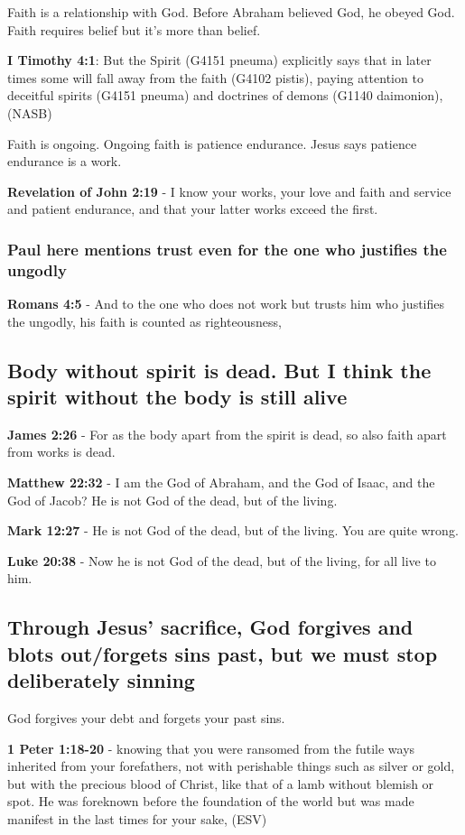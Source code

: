 \documentclass[11pt]{article}
\begin{document}
Faith is a relationship with God.
Before Abraham believed God, he obeyed God.
Faith requires belief but it's more than belief.

\textbf{I Timothy 4:1}: But the Spirit (G4151 pneuma) explicitly says that in later times some will fall away from the faith (G4102 pistis), paying attention to deceitful spirits (G4151 pneuma) and doctrines of demons (G1140 daimonion), (NASB)

Faith is ongoing. Ongoing faith is patience endurance. Jesus says patience endurance is a work.

\textbf{Revelation of John 2:19} - I know your works, your love and faith and service and patient endurance, and that your latter works exceed the first.

\subsubsection{Paul here mentions trust even for the one who justifies the ungodly}
\label{sec:org8bd46f6}
\textbf{Romans 4:5} - And to the one who does not work but trusts him who justifies the ungodly, his faith is counted as righteousness,

\subsection{Body without spirit is dead. But I think the spirit without the body is still alive}
\label{sec:org5b52cdf}
\textbf{James 2:26} - For as the body apart from the spirit is dead, so also faith apart from works is dead.

\textbf{Matthew 22:32} - I am the God of Abraham, and the God of Isaac, and the God of Jacob? He is not God of the dead, but of the living.

\textbf{Mark 12:27} - He is not God of the dead, but of the living. You are quite wrong.

\textbf{Luke 20:38} - Now he is not God of the dead, but of the living, for all live to him.

\subsection{Through Jesus' sacrifice, God forgives and blots out/forgets sins past, but we must stop deliberately sinning}
\label{sec:org88cb171}
God forgives your debt and forgets your past sins.

\textbf{1 Peter 1:18-20} - knowing that you were ransomed from the futile ways inherited from your forefathers, not with perishable things such as silver or gold, but with the precious blood of Christ, like that of a lamb without blemish or spot. He was foreknown before the foundation of the world but was made manifest in the last times for your sake, (ESV)
\end{document}
